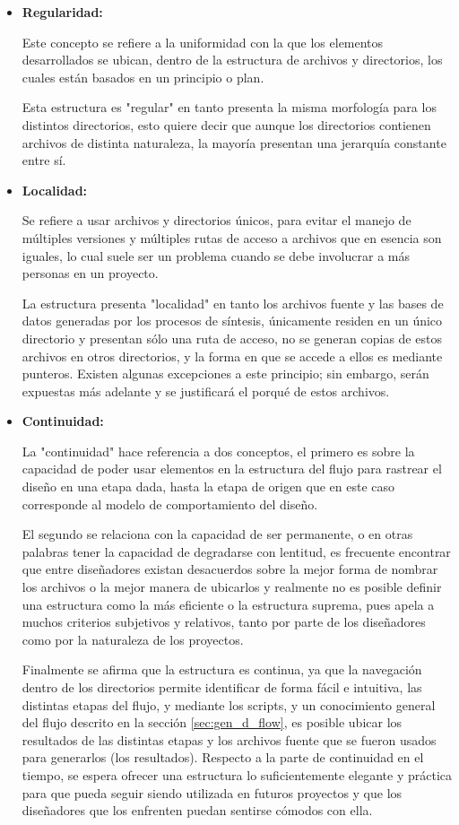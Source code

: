 \begin{itemize}
\item {\textbf{Regularidad:}} {Este concepto se refiere a la uniformidad con la que los elementos desarrollados se ubican, dentro de la estructura de archivos y directorios, los cuales están basados en un principio o plan.

Esta estructura es "regular" en tanto presenta la misma morfología para los distintos directorios, esto quiere decir que aunque los directorios contienen archivos de distinta naturaleza, la mayoría presentan una jerarquía constante entre sí.}

\item {\textbf{Localidad:}} {Se refiere a usar archivos y directorios únicos, para evitar el manejo de múltiples versiones y múltiples rutas de acceso a archivos que en esencia son iguales, lo cual suele ser un problema cuando se debe involucrar a más personas en un proyecto.

La estructura presenta "localidad" en tanto los archivos fuente y las bases de datos generadas por los procesos de síntesis, únicamente residen en un único directorio y presentan sólo una ruta de acceso, no se generan copias de estos archivos en otros directorios, y la forma en que se accede a ellos es mediante punteros. Existen algunas excepciones a este principio; sin embargo, serán expuestas más adelante y se justificará el porqué de estos archivos.}

\item {\textbf{Continuidad:}} {La "continuidad" hace referencia a dos conceptos, el primero es sobre la capacidad de poder usar elementos en la estructura del flujo para rastrear el diseño en una etapa dada, hasta la etapa de origen que en este caso corresponde al modelo de comportamiento del diseño.

El segundo se relaciona con la capacidad de ser permanente, o en otras palabras tener la capacidad de degradarse con lentitud, es frecuente encontrar que entre diseñadores existan desacuerdos sobre la mejor forma de nombrar los archivos o la mejor manera de ubicarlos y realmente no es posible definir una estructura como la más eficiente o la estructura suprema, pues apela a muchos criterios subjetivos y relativos, tanto por parte de los diseñadores como por la naturaleza de los proyectos. 

Finalmente se afirma que la estructura es continua, ya que la navegación dentro de los directorios permite identificar de forma fácil e intuitiva, las distintas etapas del flujo, y mediante los scripts, y un conocimiento general del flujo descrito en la sección \ref{sec:gen_d_flow}, es posible ubicar los resultados de las distintas etapas y los archivos fuente que se fueron usados para generarlos (los resultados). Respecto a la parte de continuidad en el tiempo, se espera ofrecer una estructura lo suficientemente elegante y práctica para que pueda seguir siendo utilizada en futuros proyectos y que los diseñadores que los enfrenten puedan sentirse cómodos con ella.}

\end{itemize}

